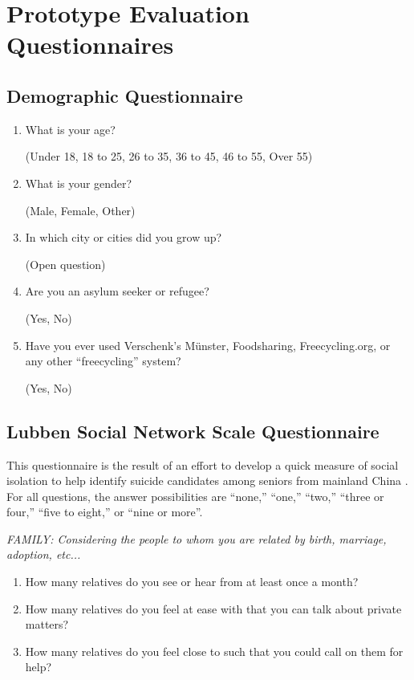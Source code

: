\chapter{Prototype Evaluation Questionnaires}
\label{app:questionnaires}

\section{Demographic Questionnaire}
\label{app:questionnaires-demographic}

\begin{enumerate}
    \item What is your age?

    (Under 18, 18 to 25, 26 to 35, 36 to 45, 46 to 55, Over 55)

    \item What is your gender?

    (Male, Female, Other)

    \item In which city or cities did you grow up?

    (Open question)

    \item Are you an asylum seeker or refugee?

    (Yes, No)

    \item Have you ever used Verschenk's Münster, Foodsharing, Freecycling.org, or any other ``freecycling'' system?

    (Yes, No)
\end{enumerate}


\section{Lubben Social Network Scale Questionnaire}
\label{app:questionnaires-lsns}

This questionnaire is the result of an effort to develop a quick measure of social isolation to help identify suicide candidates among seniors from mainland China \cite{chang_validation_2018}. For all questions, the answer possibilities are ``none,'' ``one,'' ``two,'' ``three or four,'' ``five to eight,'' or ``nine or more''.

\noindent \textit{FAMILY: Considering the people to whom you are related by birth, marriage, adoption, etc...}
\begin{enumerate}
    \item How many relatives do you see or hear from at least once a month?
    \item How many relatives do you feel at ease with that you can talk about private matters?
    \item How many relatives do you feel close to such that you could call on them for help?
\end{enumerate}

